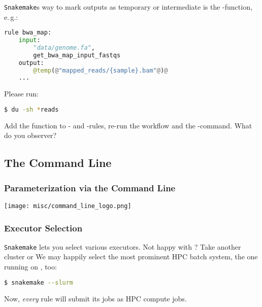 \begin{frame}[fragile]
  \frametitle{}
  \texttt{Snakemake}s way to mark outputs as temporary or intermediate is the -function, e.\,g.:
  \begin{lstlisting}[language=Python,style=Python]
rule bwa_map:
    input:
        "data/genome.fa",
        get_bwa_map_input_fastqs
    output:
        @temp(@"mapped_reads/{sample}.bam"@)@
    ...
  \end{lstlisting}
  \pause
  Please run:
  \begin{lstlisting}[language=Bash, style=Shell]
$ du -sh *reads
  \end{lstlisting}
  Add the  function to - and -rules, re-run the workflow and the -command. What do you observer?
\end{frame}


\subsection{The Command Line}

\begin{frame}
  \frametitle{Parameterization via the Command Line}
  \centering
  \texttt{[image: misc/command\_line\_logo.png]}
\end{frame}

\begin{frame}[fragile]
  \frametitle{Executor Selection}
  \texttt{Snakemake} lets you select various executors. Not happy with \mogon? Take another cluster or  \newline
  We may happily select the most prominent HPC batch system, the one running on \mogon, too:
  \begin{lstlisting}[language=Bash, style=Shell]
$ snakemake --slurm
  \end{lstlisting}
  Now, \emph{every} rule will submit its jobs as HPC compute jobs.
\end{frame}

